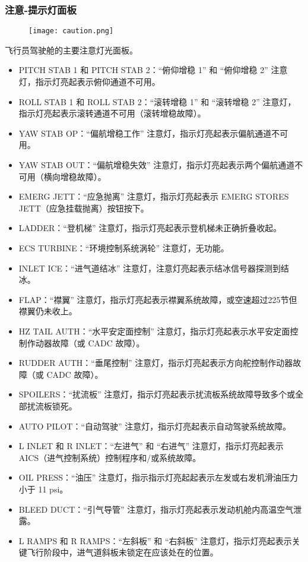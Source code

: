 \subsubsection{注意-提示灯面板}

\begin{figure}[htb]
	\centering
	\texttt{[image: caution.png]}
\end{figure}
飞行员驾驶舱的主要注意灯光面板。

\begin{itemize}
	\item PITCH STAB 1 和 PITCH STAB 2：“俯仰增稳 1” 和 “俯仰增稳 2” 注意灯，指示灯亮起表示俯仰通道不可用。
	\item ROLL STAB 1 和 ROLL STAB 2：“滚转增稳 1” 和 “滚转增稳 2” 注意灯，指示灯亮起表示滚转通道不可用（滚转增稳故障）。
	\item YAW STAB OP：“偏航增稳工作” 注意灯，指示灯亮起表示偏航通道不可用。
	\item YAW STAB OUT：“偏航增稳失效” 注意灯，指示灯亮起表示两个偏航通道不可用（横向增稳故障）。
	\item EMERG JETT：“应急抛离” 注意灯，指示灯亮起表示 EMERG STORES JETT（应急挂载抛离）按钮按下。
	\item LADDER：“登机梯” 注意灯，指示灯亮起表示登机梯未正确折叠收起。
	\item ECS TURBINE：“环境控制系统涡轮” 注意灯，无功能。
	\item INLET ICE：“进气道结冰” 注意灯，注意灯亮起表示结冰信号器探测到结冰。
	\item FLAP：“襟翼” 注意灯，指示灯亮起表示襟翼系统故障，或空速超过225节但襟翼仍未收上。
	\item HZ TAIL AUTH：“水平安定面控制” 注意灯，指示灯亮起表示水平安定面控制作动器故障（或 CADC 故障）。
	\item RUDDER AUTH：“垂尾控制” 注意灯，指示灯亮起表示方向舵控制作动器故障（或 CADC 故障）。
	\item SPOILERS：“扰流板” 注意灯，指示灯亮起表示扰流板系统故障导致多个或全部扰流板锁死。
	\item AUTO PILOT：“自动驾驶” 注意灯，指示灯亮起表示自动驾驶系统故障。
	\item L INLET 和 R INLET：“左进气” 和 “右进气” 注意灯，指示灯亮起表示 AICS（进气控制系统）控制程序和/或系统故障。
	\item OIL PRESS：“油压” 注意灯，指示指示灯亮起起表示左发或右发机滑油压力小于 11 psi。
	\item BLEED DUCT：“引气导管” 注意灯，指示灯亮起表示发动机舱内高温空气泄露。
	\item L RAMPS 和 R RAMPS：“左斜板” 和 “右斜板” 注意灯，指示灯亮起表示关键飞行阶段中，进气道斜板未锁定在应该处在的位置。

\end{itemize}
